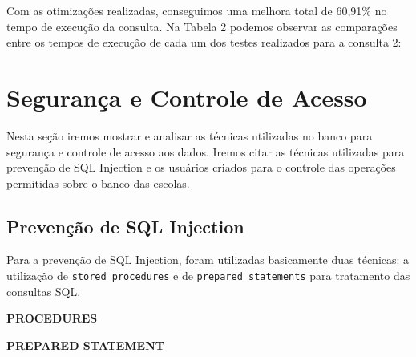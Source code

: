 \documentclass[12pt,a4paper]{article}
\begin{document}
Com as otimizações realizadas, conseguimos uma melhora total de 60,91\% no tempo de execução da consulta. Na Tabela 2 podemos observar as comparações entre os tempos de execução de cada um dos testes realizados para a consulta 2:

\begin{table}[htbp]
  \centering
  \caption{Comparação - Consulta 2}
  \label{tab:addlabel}%
\end{table}%


\section{Segurança e Controle de Acesso}

Nesta seção iremos mostrar e analisar as técnicas utilizadas no banco para segurança e controle de acesso aos dados. Iremos citar as técnicas utilizadas para prevenção de SQL Injection e os usuários criados para o controle das operações permitidas sobre o banco das escolas.

\subsection{Prevenção de SQL Injection}

Para a prevenção de SQL Injection, foram utilizadas basicamente duas técnicas: a utilização de \texttt{stored procedures} e de \texttt{prepared statements} para tratamento das consultas SQL.

\begin{flushleft}
\textbf{PROCEDURES}\\
\end{flushleft}



\begin{flushleft}
\textbf{PREPARED STATEMENT}\\
\end{flushleft}
\end{document}
